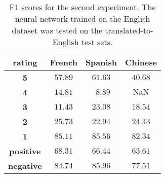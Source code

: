 \documentclass[11pt,a4paper]{article}
\newcommand{\nan}{\mathrm{NaN}}
\begin{document}
    \begin{table}[ht!]
        \centering
        \begin{tabular}{cccc}
            \toprule
                \multirow[c]{1}{*}{\textbf{rating}} &
                \multicolumn{1}{c}{\textbf{French}} &
                \multicolumn{1}{c}{\textbf{Spanish}} &
                \multicolumn{1}{c}{\textbf{Chinese}} \\
            \midrule
                \textbf{5} & $57.89$ & $61.63$    & $40.68$\\
                \textbf{4} & $14.81$ & $\:\:8.89$ &  $\nan$\\
                \textbf{3} & $11.43$ & $23.08$    & $18.54$\\
                \textbf{2} & $25.73$ & $22.94$    & $24.43$\\
                \textbf{1} & $85.11$ & $85.56$    & $82.34$\\
            \midrule
                \textbf{positive} & $68.31$ & $66.44$ & $63.61$\\
                \textbf{negative} & $84.74$ & $85.96$ & $77.51$\\
            \bottomrule
        \end{tabular}
        \caption{F1 scores for the second experiment. The neural network trained on the English dataset was tested on the translated-to-English test sets.}
        \label{Experiment2}
    \end{table}
\end{document}
